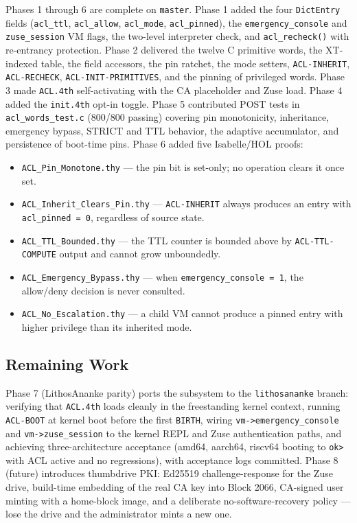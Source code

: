 Phases 1 through 6 are complete on \texttt{master}. Phase 1 added the four
\texttt{DictEntry} fields (\texttt{acl\_ttl}, \texttt{acl\_allow},
\texttt{acl\_mode}, \texttt{acl\_pinned}), the \texttt{emergency\_console} and
\texttt{zuse\_session} VM flags, the two-level interpreter check, and
\texttt{acl\_recheck()} with re-entrancy protection. Phase 2 delivered the
twelve C primitive words, the XT-indexed table, the field accessors, the pin
ratchet, the mode setters, \texttt{ACL-INHERIT}, \texttt{ACL-RECHECK},
\texttt{ACL-INIT-PRIMITIVES}, and the pinning of privileged words. Phase 3 made
\texttt{ACL.4th} self-activating with the CA placeholder and Zuse load. Phase 4
added the \texttt{init.4th} opt-in toggle. Phase 5 contributed POST tests in
\texttt{acl\_words\_test.c} (800/800 passing) covering pin monotonicity,
inheritance, emergency bypass, STRICT and TTL behavior, the adaptive
accumulator, and persistence of boot-time pins. Phase 6 added five Isabelle/HOL
proofs:

\begin{itemize}
  \item \texttt{ACL\_Pin\_Monotone.thy} --- the pin bit is set-only; no
    operation clears it once set.
  \item \texttt{ACL\_Inherit\_Clears\_Pin.thy} --- \texttt{ACL-INHERIT} always
    produces an entry with \texttt{acl\_pinned = 0}, regardless of source state.
  \item \texttt{ACL\_TTL\_Bounded.thy} --- the TTL counter is bounded above by
    \texttt{ACL-TTL-COMPUTE} output and cannot grow unboundedly.
  \item \texttt{ACL\_Emergency\_Bypass.thy} --- when
    \texttt{emergency\_console = 1}, the allow/deny decision is never consulted.
  \item \texttt{ACL\_No\_Escalation.thy} --- a child VM cannot produce a pinned
    entry with higher privilege than its inherited mode.
\end{itemize}

\subsection{Remaining Work}

Phase 7 (LithosAnanke parity) ports the subsystem to the
\texttt{lithosananke} branch: verifying that \texttt{ACL.4th} loads cleanly in
the freestanding kernel context, running \texttt{ACL-BOOT} at kernel boot before
the first \texttt{BIRTH}, wiring \texttt{vm->emergency\_console} and
\texttt{vm->zuse\_session} to the kernel REPL and Zuse authentication paths, and
achieving three-architecture acceptance (amd64, aarch64, riscv64 booting to
\texttt{ok>} with ACL active and no regressions), with acceptance logs
committed. Phase 8 (future) introduces thumbdrive PKI: Ed25519
challenge-response for the Zuse drive, build-time embedding of the real CA key
into Block 2066, CA-signed user minting with a home-block image, and a
deliberate no-software-recovery policy --- lose the drive and the administrator
mints a new one.

